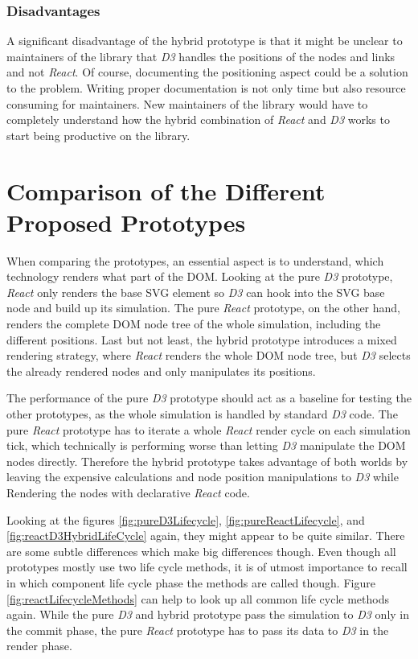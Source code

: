 \subsubsection{Disadvantages}
\label{subsub:hybridDisadvantages}

A significant disadvantage of the hybrid prototype is that it might be unclear to maintainers of the library that \emph{D3} handles the positions of the nodes and links and not \emph{React}. Of course, documenting the positioning aspect could be a solution to the problem. Writing proper documentation is not only time but also resource consuming for maintainers. New maintainers of the library would have to completely understand how the hybrid combination of \emph{React} and \emph{D3} works to start being productive on the library.

\section{Comparison of the Different Proposed Prototypes}

When comparing the prototypes, an essential aspect is to understand, which technology renders what part of the DOM. Looking at the pure \emph{D3} prototype, \emph{React} only renders the base SVG element so \emph{D3} can hook into the SVG base node and build up its simulation. The pure \emph{React} prototype, on the other hand, renders the complete DOM node tree of the whole simulation, including the different positions. Last but not least, the hybrid prototype introduces a mixed rendering strategy, where \emph{React} renders the whole DOM node tree, but \emph{D3} selects the already rendered nodes and only manipulates its positions.

The performance of the pure \emph{D3} prototype should act as a baseline for testing the other prototypes, as the whole simulation is handled by standard \emph{D3} code. The pure \emph{React} prototype has to iterate a whole \emph{React} render cycle on each simulation tick, which technically is performing worse than letting \emph{D3} manipulate the DOM nodes directly. Therefore the hybrid prototype takes advantage of both worlds by leaving the expensive calculations and node position manipulations to \emph{D3} while Rendering the nodes with declarative \emph{React} code.

Looking at the figures \ref{fig:pureD3Lifecycle}, \ref{fig:pureReactLifecycle}, and \ref{fig:reactD3HybridLifeCycle} again, they might appear to be quite similar. There are some subtle differences which make big differences though. Even though all prototypes mostly use two life cycle methods, it is of utmost importance to recall in which component life cycle phase the methods are called though. Figure \ref{fig:reactLifecycleMethods} can help to look up all common life cycle methods again. While the pure \emph{D3} and hybrid prototype pass the simulation to \emph{D3} only in the commit phase, the pure \emph{React} prototype has to pass its data to \emph{D3} in the render phase.


